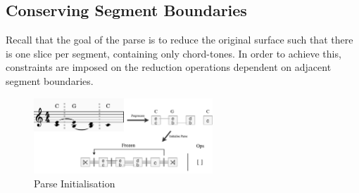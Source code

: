 \documentclass[12pt,a4paper,twoside,openany]{report} \usepackage[pdfborder={0 0 0}]{hyperref}    %
\theoremstyle{definition} \newtheorem{definition}{Definition}[section]
\begin{document}
%
%
%
%
%
%

  \subsection{Conserving Segment Boundaries}
  \label{sub:boundaryHandling}

  Recall that the goal of the parse is to reduce the original surface such that there is one slice per segment,
  containing only chord-tones. In order to achieve this, constraints are imposed on the reduction operations dependent
  on adjacent segment boundaries. 

  \begin{figure}[ht] \centering \includegraphics[width=0.6\textwidth]{impl/parseInit.png} \caption{Parse Initialisation}
  \label{fig:parseInit} \end{figure}
\end{document}
